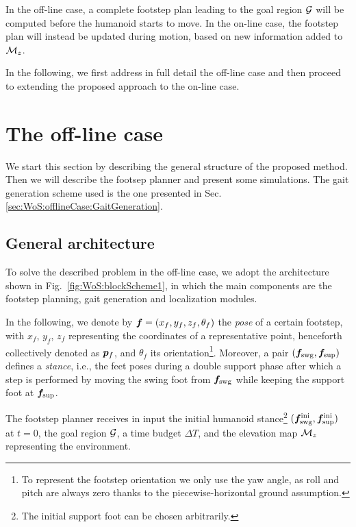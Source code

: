 In the off-line case, a complete footstep plan leading to the goal region $\cal G$ will be computed before the humanoid starts to move. In the on-line case, the footstep plan will instead be updated during motion, based on new information added to ${\cal M}_{z}$. 

In the following, we first address in full detail the off-line case and then proceed to extending the proposed approach to the on-line case.

\section{The off-line case} 
\label{sec:WoS:offlineCase}
We start this section by describing the general structure of the proposed method. Then we will describe the footsep planner and present some simulations. The gait generation scheme used is the one presented in Sec. \ref{sec:WoS:offlineCase:GaitGeneration}.

\subsection{General architecture}
\label{sec:WoS:offlineCase:GeneralArchitecture}

To solve the described problem in the off-line case, we adopt the architecture shown in Fig.~\ref{fig:WoS:blockScheme1}, in which the main components are the footstep planning, gait generation and localization modules.

In the following, we denote by ${\bm{f}} = (x_{f}, y_{f}, z_{f}, \theta_{f})$ the {\em pose} of a certain footstep, with $x_{f}$, $y_{f}$, $z_{f}$ representing the coordinates of a representative point, henceforth collectively denoted as ${\bm{p}}_f$, and $\theta_{f}$ its orientation\footnote{To represent the footstep orientation we only use the yaw angle, as roll and pitch are always zero thanks to the piecewise-horizontal ground assumption.}.
Moreover, a pair $({\bm{f}}_{\rm swg}, {\bm{f}}_{\rm sup})$ defines a {\em stance}, i.e., the feet poses during a double support phase after which a step is performed by moving the swing foot from ${\bm{f}}_{\rm swg}$ while keeping the support foot at ${\bm{f}}_{\rm sup}$. 

The footstep planner receives in input the initial humanoid stance\footnote{The initial support foot can be chosen arbitrarily.} $({\bm{f}}_{\rm swg}^{\rm ini}, {\bm{f}}_{\rm sup}^{\rm ini})$ at $t=0$, the goal region $\cal G$, a time budget $\Delta T$, and the elevation map ${\cal M}_z$ representing the environment.

